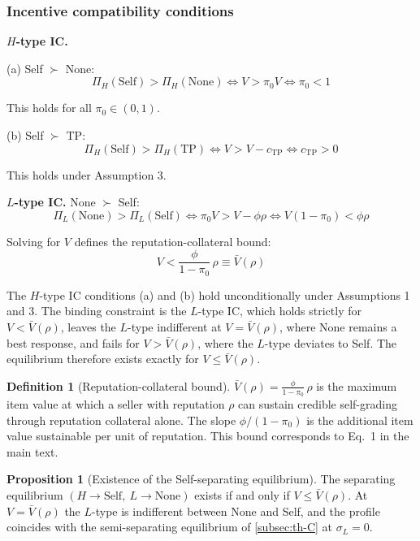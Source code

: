 \documentclass[11pt,letterpaper]{article}
\theoremstyle{definition}
\newtheorem{definition}{Definition}[section]
\newtheorem{proposition}{Proposition}[section]
\begin{document}
\subsubsection*{Incentive compatibility conditions}

\textbf{$H$-type IC.}

(a) Self $\succ$ None:
\[\Pi_H(\text{Self}) > \Pi_H(\text{None}) \iff V > \pi_0 V \iff \pi_0 < 1\]

This holds for all $\pi_0 \in (0, 1)$.

(b) Self $\succ$ TP:
\[\Pi_H(\text{Self}) > \Pi_H(\text{TP}) \iff V > V - c_{\text{TP}} \iff c_{\text{TP}} > 0\]

This holds under Assumption 3.

\textbf{$L$-type IC.} None $\succ$ Self:
\[\Pi_L(\text{None}) > \Pi_L(\text{Self}) \iff \pi_0 V > V - \phi\rho \iff V(1 - \pi_0) < \phi\rho\]

Solving for $V$ defines the reputation-collateral bound:
\begin{equation}
V < \frac{\phi}{1 - \pi_0}\,\rho \equiv \bar{V}(\rho) \label{eq:bar-V}
\end{equation}

The $H$-type IC conditions (a) and (b) hold unconditionally under Assumptions 1 and 3. The binding constraint is the $L$-type IC, which holds strictly for $V < \bar{V}(\rho)$, leaves the $L$-type indifferent at $V = \bar{V}(\rho)$, where None remains a best response, and fails for $V > \bar{V}(\rho)$, where the $L$-type deviates to Self. The equilibrium therefore exists exactly for $V \leq \bar{V}(\rho)$.

\begin{definition}[Reputation-collateral bound]
$\bar{V}(\rho) = \frac{\phi}{1-\pi_0}\,\rho$ is the maximum item value at which a seller with reputation $\rho$ can sustain credible self-grading through reputation collateral alone. The slope $\phi/(1-\pi_0)$ is the additional item value sustainable per unit of reputation. This bound corresponds to Eq.~1 in the main text.
\end{definition}

\begin{proposition}[Existence of the Self-separating equilibrium]\label{prop:self-existence}
The separating equilibrium $(H \to \text{Self},\ L \to \text{None})$ exists if and only if $V \leq \bar{V}(\rho)$. At $V = \bar{V}(\rho)$ the $L$-type is indifferent between None and Self, and the profile coincides with the semi-separating equilibrium of \ref{subsec:th-C} at $\sigma_L = 0$.
\end{proposition}
\end{document}
